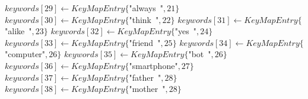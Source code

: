\documentclass[a4paper,10pt]{article}
\begin{document}
\begin{function}
{  \(keywords[29]\leftarrow{}KeyMapEntry\{\)"{}always\ "{}\(,21\}\)\;
  \(keywords[30]\leftarrow{}KeyMapEntry\{\)"{}think\ "{}\(,22\}\)\;
  \(keywords[31]\leftarrow{}KeyMapEntry\{\)"{}alike\ "{}\(,23\}\)\;
  \(keywords[32]\leftarrow{}KeyMapEntry\{\)"{}yes\ "{}\(,24\}\)\;
  \(keywords[33]\leftarrow{}KeyMapEntry\{\)"{}friend\ "{}\(,25\}\)\;
  \(keywords[34]\leftarrow{}KeyMapEntry\{\)"{}computer"{}\(,26\}\)\;
  \(keywords[35]\leftarrow{}KeyMapEntry\{\)"{}bot\ "{}\(,26\}\)\;
  \(keywords[36]\leftarrow{}KeyMapEntry\{\)"{}smartphone"{}\(,27\}\)\;
  \(keywords[37]\leftarrow{}KeyMapEntry\{\)"{}father\ "{}\(,28\}\)\;
  \(keywords[38]\leftarrow{}KeyMapEntry\{\)"{}mother\ "{}\(,28\}\)\;
}
\end{function}


\end{document}
